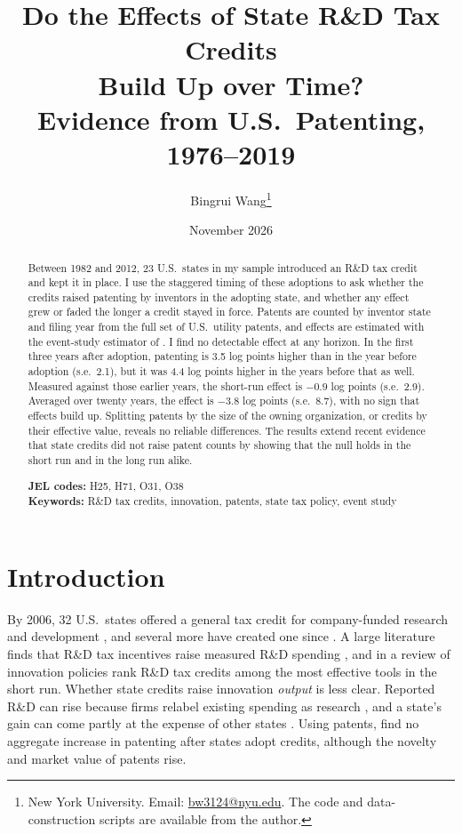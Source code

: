 \documentclass[12pt]{article}
\title{Do the Effects of State R\&D Tax Credits\\ Build Up over Time?\\[4pt]
\large Evidence from U.S.\ Patenting, 1976--2019}
\author{Bingrui Wang\thanks{New York University. Email: \href{mailto:bw3124@nyu.edu}{bw3124@nyu.edu}.
The code and data-construction scripts are available from the author.}}
\date{November 2026}
\begin{document}
\maketitle

\begin{abstract}
\noindent Between 1982 and 2012, 23 U.S.\ states in my sample introduced an R\&D tax credit and kept it in
place. I use the staggered timing of these adoptions to ask whether the credits raised patenting by inventors
in the adopting state, and whether any effect grew or faded the longer a credit stayed in force. Patents are
counted by inventor state and filing year from the full set of U.S.\ utility patents, and effects are estimated
with the event-study estimator of \citet{callaway2021difference}. I find no detectable effect at any horizon.
In the first three years after adoption, patenting is 3.5 log points higher than in the year before adoption
(s.e.\ 2.1), but it was 4.4 log points higher in the years before that as well. Measured against those earlier
years, the short-run effect is $-0.9$ log points (s.e.\ 2.9). Averaged over twenty years, the effect is $-3.8$
log points (s.e.\ 8.7), with no sign that effects build up. Splitting patents by the size of the owning
organization, or credits by their effective value, reveals no reliable differences. The results extend recent
evidence that state credits did not raise patent counts by showing that the null holds in the short run and in
the long run alike.

\medskip
\noindent\textbf{JEL codes:} H25, H71, O31, O38\\
\noindent\textbf{Keywords:} R\&D tax credits, innovation, patents, state tax policy, event study
\end{abstract}

\newpage

\section{Introduction}

By 2006, 32 U.S.\ states offered a general tax credit for company-funded research and development
\citep{wilson2009beggar}, and several more have created one since \citep{iowa2021research}. A large
literature finds that R\&D tax incentives raise measured R\&D spending
\citep{hall1993rd,hall2000effective,bloom2002credits,rao2016credits,guceri2019effectiveness}, and in a review
of innovation policies \citet{bloom2019toolkit} rank R\&D tax credits among the most effective tools in the
short run. Whether state credits raise innovation \emph{output} is less clear. Reported R\&D can rise because
firms relabel existing spending as research \citep{chen2021notching}, and a state's gain can come partly at the
expense of other states \citep{wilson2009beggar}. Using patents, \citet{melnik2024rd} find no aggregate
increase in patenting after states adopt credits, although the novelty and market value of patents rise.
\end{document}
